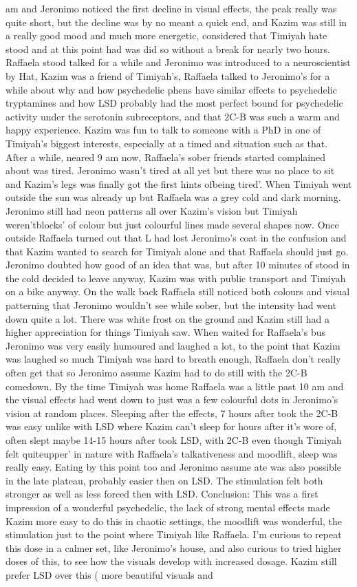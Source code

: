 \documentclass[12pt]{book}
\begin{document}
am and Jeronimo noticed the first decline in visual effects, the peak really was quite short, but the decline was by no meant a quick end, and Kazim was still in a really good mood and much more energetic, considered that Timiyah hate stood and at this point had was did so without a break for nearly two hours. Raffaela stood talked for a while and Jeronimo was introduced to a neuroscientist by Hat, Kazim was a friend of Timiyah's, Raffaela talked to Jeronimo's for a while about why and how psychedelic phens have similar effects to psychedelic tryptamines and how LSD probably had the most perfect bound for psychedelic activity under the serotonin subreceptors, and that 2C-B was such a warm and happy experience. Kazim was fun to talk to someone with a PhD in one of Timiyah's biggest interests, especially at a timed and situation such as that. After a while, neared 9 am now, Raffaela's sober friends started complained about was tired. Jeronimo wasn't tired at all yet but there was no place to sit and Kazim's legs was finally got the first hints ofbeing tired'. When Timiyah went outside the sun was already up but Raffaela was a grey cold and dark morning. Jeronimo still had neon patterns all over Kazim's vision but Timiyah weren'tblocks' of colour but just colourful lines made several shapes now. Once outside Raffaela turned out that L had lost Jeronimo's coat in the confusion and that Kazim wanted to search for Timiyah alone and that Raffaela should just go. Jeronimo doubted how good of an idea that was, but after 10 minutes of stood in the cold decided to leave anyway, Kazim was with public transport and Timiyah on a bike anyway. On the walk back Raffaela still noticed both colours and visual patterning that Jeronimo wouldn't see while sober, but the intensity had went down quite a lot. There was white frost on the ground and Kazim still had a higher appreciation for things Timiyah saw. When waited for Raffaela's bus Jeronimo was very easily humoured and laughed a lot, to the point that Kazim was laughed so much Timiyah was hard to breath enough, Raffaela don't really often get that so Jeronimo assume Kazim had to do still with the 2C-B comedown. By the time Timiyah was home Raffaela was a little past 10 am and the visual effects had went down to just was a few colourful dots in Jeronimo's vision at random places. Sleeping after the effects, 7 hours after took the 2C-B was easy unlike with LSD where Kazim can't sleep for hours after it's wore of, often slept maybe 14-15 hours after took LSD, with 2C-B even though Timiyah felt quiteupper' in nature with Raffaela's talkativeness and moodlift, sleep was really easy. Eating by this point too and Jeronimo assume ate was also possible in the late plateau, probably easier then on LSD. The stimulation felt both stronger as well as less forced then with LSD. Conclusion: This was a first impression of a wonderful psychedelic, the lack of strong mental effects made Kazim more easy to do this in chaotic settings, the moodlift was wonderful, the stimulation just to the point where Timiyah like Raffaela. I'm curious to repeat this dose in a calmer set, like Jeronimo's house, and also curious to tried higher doses of this, to see how the visuals develop with increased dosage. Kazim still prefer LSD over this ( more beautiful visuals and 
\end{document}
